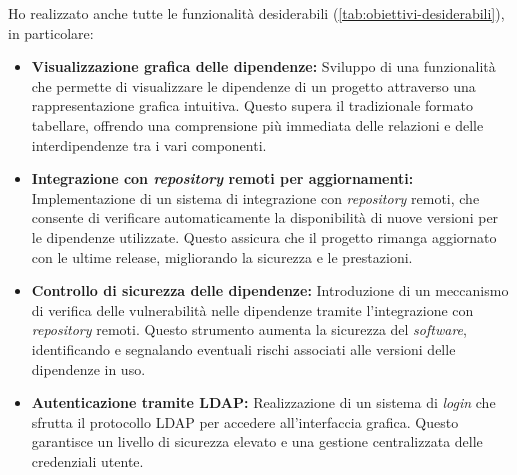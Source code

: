 Ho realizzato anche tutte le funzionalità desiderabili (\ref{tab:obiettivi-desiderabili}), in particolare:
\begin{itemize}
  \item \textbf{Visualizzazione grafica delle dipendenze:} Sviluppo di una funzionalità che permette di visualizzare 
  le dipendenze di un progetto attraverso una rappresentazione grafica intuitiva. Questo supera il tradizionale formato tabellare, 
  offrendo una comprensione più immediata delle relazioni e delle interdipendenze tra i vari componenti.
  \item \textbf{Integrazione con \textit{repository} remoti per aggiornamenti:} Implementazione di un sistema di integrazione con \textit{repository} remoti, 
  che consente di verificare automaticamente la disponibilità di nuove versioni per le dipendenze utilizzate. 
  Questo assicura che il progetto rimanga aggiornato con le ultime release, migliorando la sicurezza e le prestazioni.
  \item \textbf{Controllo di sicurezza delle dipendenze:} Introduzione di un meccanismo di verifica delle vulnerabilità 
  nelle dipendenze tramite l'integrazione con \textit{repository} remoti. Questo strumento aumenta la sicurezza del \textit{software}, identificando e segnalando eventuali rischi associati alle versioni delle dipendenze in uso.
  \item \textbf{Autenticazione tramite LDAP:} Realizzazione di un sistema di \textit{login} che sfrutta il protocollo LDAP 
  per accedere all'interfaccia grafica. 
   Questo garantisce un livello di sicurezza elevato e una gestione centralizzata delle credenziali utente.
  \end{itemize}

